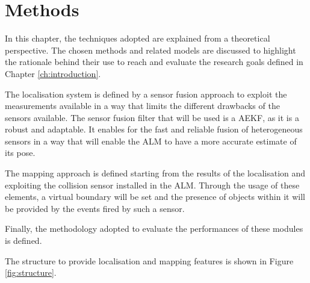 \chapter{Methods}
\label{ch:methods}

\noindent In this chapter, the techniques adopted are explained from a theoretical perspective.
The chosen methods and related models are discussed to highlight the rationale behind their use to reach and evaluate the research goals defined in Chapter \ref{ch:introduction}.

The localisation system is defined by a sensor fusion approach to exploit the measurements available in a way that limits the different drawbacks of the sensors available.
The sensor fusion filter that will be used is a \gls{AEKF}, as it is a robust and adaptable.
It enables for the fast and reliable fusion of heterogeneous sensors in a way that will enable the \gls{ALM} to have a more accurate estimate of its pose.

The mapping approach is defined starting from the results of the localisation and exploiting the collision sensor installed in the \gls{ALM}.
Through the usage of these elements, a virtual boundary will be set and the presence of objects within it will be provided by the events fired by such a sensor.

Finally, the methodology adopted to evaluate the performances of these modules is defined.

The structure to provide localisation and mapping features is shown in Figure \ref{fig:structure}.


